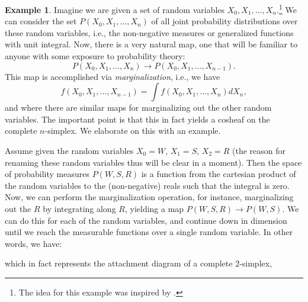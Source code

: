 \documentclass[11pt]{book}
\theoremstyle{definition}
\newtheorem{example}{Example}[section]
\theoremstyle{definition}
\theoremstyle{definition}
\theoremstyle{theorem}
\theoremstyle{definition}
\begin{document}
\begin{example}  
Imagine we are given a set of random variables $X_0, X_1, \dots, X_n$.\footnote{The idea for this example was inspired by \cite{robinson_sheaf_2016}.} We can consider the set $P(X_0, X_1,\dots, X_n)$ of all joint probability distributions over these random variables, i.e., the non-negative measures or generalized functions with unit integral. Now, there is a very natural map, one that will be familiar to anyone with some exposure to probability theory: 
\begin{equation}
P(X_0, X_1, \dots, X_n) \rightarrow P(X_0, X_1, \dots, X_{n-1}).
\end{equation}
This map is accomplished via \textit{marginalization}, i.e., we have 
\begin{equation}
f(X_0, X_1,\dots, X_{n-1}) = \int f(X_0, X_1, \dots, X_n) d X_n,
\end{equation}
and where there are similar maps for marginalizing out the other random variables. The important point is that this in fact yields a cosheaf on the complete $n$-simplex. We elaborate on this with an example. \par 
Assume given the random variables $X_0 = W$, $X_1 = S$, $X_2 = R$ (the reason for renaming these random variables thus will be clear in a moment). Then the space of probability measures $P(W,S,R)$ is a function from the cartesian product of the random variables to the (non-negative) reals such that the integral is zero. Now, we can perform the marginalization operation, for instance, marginalizing out the $R$ by integrating along $R$, yielding a map $P(W,S,R) \rightarrow P(W,S)$. We can do this for each of the random variables, and continue down in dimension until we reach the measurable functions over a single random variable. In other words, we have: 
	\begin{center} 
	\small
\end{center} 
which in fact represents the attachment diagram of a complete $2$-simplex, 
\begin{center} 
\begin{tikzpicture}


\end{tikzpicture}
\end{center}
\end{example}
\end{document}
